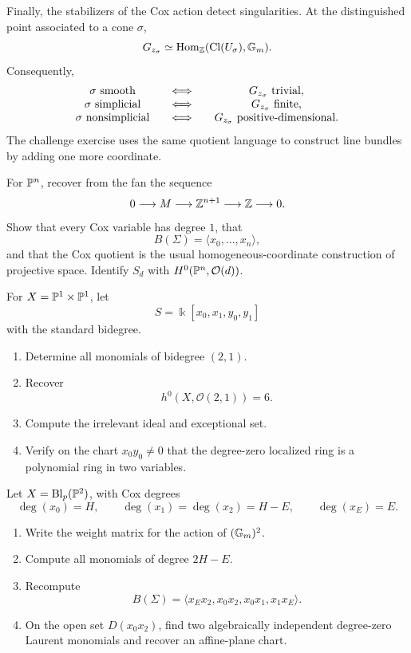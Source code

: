 Finally, the stabilizers of the Cox action detect singularities. At
the distinguished point associated to a cone \(\sigma\),
\[
G_{z_\sigma}
\simeq
\Hom_{\ZZ}(\Cl(U_\sigma),\Gm).
\]
Consequently,
\[
\begin{array}{c@{\qquad\Longleftrightarrow\qquad}c}
\sigma\text{ smooth}
&
G_{z_\sigma}\text{ trivial},
\\
\sigma\text{ simplicial}
&
G_{z_\sigma}\text{ finite},
\\
\sigma\text{ nonsimplicial}
&
G_{z_\sigma}\text{ positive-dimensional}.
\end{array}
\]
The challenge exercise uses the same quotient language to construct
line bundles by adding one more coordinate.

\begin{exercises}

\item For \(\PP^n\), recover from the fan the sequence
\[
0\longrightarrow M
\longrightarrow\ZZ^{n+1}
\longrightarrow\ZZ
\longrightarrow0.
\]
Show that every Cox variable has degree \(1\), that
\[
B(\Sigma)=\langle x_0,\ldots,x_n\rangle,
\]
and that the Cox quotient is the usual homogeneous-coordinate
construction of projective space. Identify \(S_d\) with
\(H^0(\PP^n,\mathcal O(d))\).

\item For \(X=\PP^1\times\PP^1\), let
\[
S=\Bbbk[x_0,x_1,y_0,y_1]
\]
with the standard bidegree.
\begin{enumerate}[label=(\alph*),wide=0pt]
\item Determine all monomials of bidegree \((2,1)\).
\item Recover
\[
h^0(X,\mathcal O(2,1))=6.
\]
\item Compute the irrelevant ideal and exceptional set.
\item Verify on the chart \(x_0y_0\neq0\) that the degree-zero
localized ring is a polynomial ring in two variables.
\end{enumerate}

\item Let \(X=\Blp{\PP^2}{p}\), with Cox degrees
\[
\deg(x_0)=H,
\qquad
\deg(x_1)=\deg(x_2)=H-E,
\qquad
\deg(x_E)=E.
\]
\begin{enumerate}[label=(\alph*),wide=0pt]
\item Write the weight matrix for the action of \((\Gm)^2\).
\item Compute all monomials of degree \(2H-E\).
\item Recompute
\[
B(\Sigma)
=
\langle x_Ex_2,x_0x_2,x_0x_1,x_1x_E\rangle.
\]
\item On the open set \(D(x_0x_2)\), find two algebraically
independent degree-zero Laurent monomials and recover an affine-plane
chart.
\end{enumerate}


\end{exercises}
